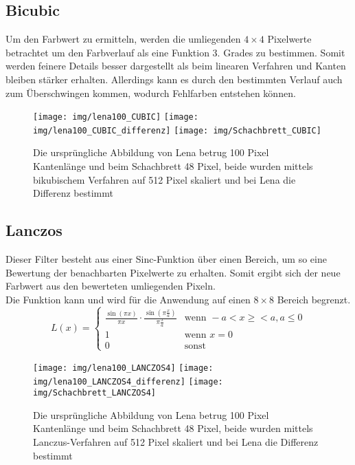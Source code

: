 \subsection{Bicubic}
Um den Farbwert zu ermitteln, werden die umliegenden $4\times 4$ Pixelwerte betrachtet um den Farbverlauf als eine Funktion 3. Grades zu bestimmen. Somit werden feinere Details besser dargestellt als beim linearen Verfahren und Kanten bleiben stärker erhalten. Allerdings kann es durch den bestimmten Verlauf auch zum Überschwingen kommen, wodurch Fehlfarben entstehen können.
\cite{wiki_Bicubic}
\begin{figure}
	\centering
	\texttt{[image: img/lena100\_CUBIC]}
	\texttt{[image: img/lena100\_CUBIC\_differenz]}
	\texttt{[image: img/Schachbrett\_CUBIC]}
	\caption{Die ursprüngliche Abbildung von Lena betrug 100 Pixel Kantenlänge und beim Schachbrett 48 Pixel, beide wurden mittels bikubischem Verfahren auf 512 Pixel skaliert und bei Lena die Differenz bestimmt}
	\label{img_Bicubic}
\end{figure}
\subsection{Lanczos}
Dieser Filter besteht aus einer Sinc-Funktion über einen Bereich, um so eine Bewertung der benachbarten Pixelwerte zu erhalten. Somit ergibt sich der neue Farbwert aus den bewerteten umliegenden Pixeln.\\
Die Funktion kann und wird für die Anwendung auf einen $8\times 8$ Bereich begrenzt. \cite{wiki_Lanczos}
\[ L(x)= \left\{ \begin{array}{ll}
\frac{\sin(\pi x)}{\pi x} \cdot \frac{\sin(\pi \frac{x}{a})}{\pi \frac{x}{a}} & \textrm{wenn } -a < x \ge<a, a\leq 0\\
1 & \textrm{wenn } x = 0\\
0 & \textrm{sonst}
\end{array}\right. \]
\begin{figure}
	\centering
	\texttt{[image: img/lena100\_LANCZOS4]}
	\texttt{[image: img/lena100\_LANCZOS4\_differenz]}
	\texttt{[image: img/Schachbrett\_LANCZOS4]}
	\caption{Die ursprüngliche Abbildung von Lena betrug 100 Pixel Kantenlänge und beim Schachbrett 48 Pixel, beide wurden mittels Lanczus-Verfahren auf 512 Pixel skaliert und bei Lena die Differenz bestimmt}
	\label{img_Lanczos}
\end{figure}
